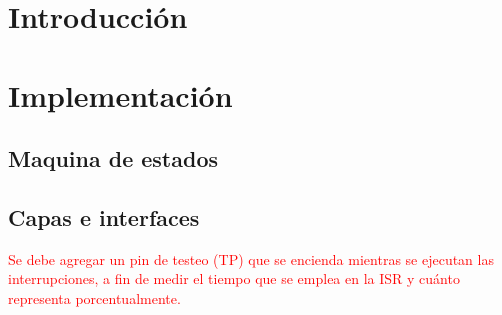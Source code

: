 







\tableofcontents
\newpage


\section{Introducción}
	\label{intro}
	

\section{Implementación}
	\subsection{Maquina de estados}
	\label{imp}
	
	
	\subsection{Capas e interfaces}
	\label{drivers}
	

%	

%	


\begin{center}
\textcolor{red}{\LARGE{Se debe agregar un pin de testeo (TP) que se encienda mientras se ejecutan las interrupciones, a fin de medir el tiempo que se emplea en la ISR y cuánto representa porcentualmente.}}
\end{center}


